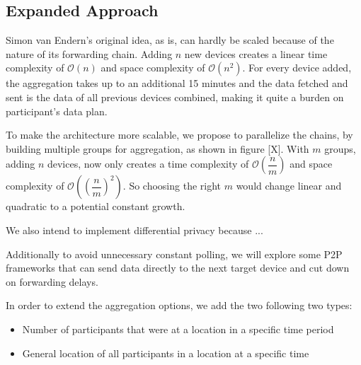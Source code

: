 \subsection{Expanded Approach}
Simon van Endern's original idea, as is, can hardly be scaled because of the nature of its forwarding chain. Adding \(n\) new devices creates a linear time complexity of \(\mathcal{O}(n)\) and space complexity of \(\mathcal{O}(n^2)\). For every device added, the aggregation takes up to an additional 15 minutes and the data fetched and sent is the data of all previous devices combined, making it quite a burden on participant's data plan. 

To make the architecture more scalable, we propose to parallelize the chains, by building multiple groups for aggregation, as shown in figure [X]. With \(m\) groups, adding \(n\) devices, now only creates a time complexity of \(\mathcal{O}(\dfrac{n}{m})\) and space complexity of \(\mathcal{O}((\dfrac{n}{m})^2)\). So choosing the right \(m\) would change linear and quadratic to a potential constant growth. 

We also intend to implement differential privacy because ...

Additionally to avoid unnecessary constant polling, we will explore some P2P frameworks that can send data directly to the next target device and cut down on forwarding delays.

In order to extend the aggregation options, we add the two following two types:
\begin{itemize}
	\item Number of participants that were at a location in a specific time period
	\item General location of all participants in a location at a specific time
\end{itemize}

